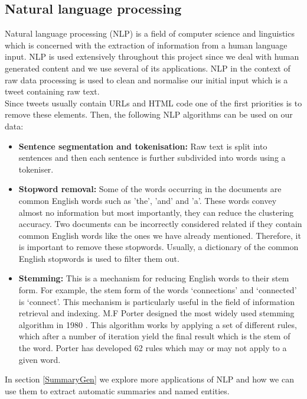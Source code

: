 \subsection{Natural language processing}

Natural language processing (NLP) is a field of computer science and linguistics which is concerned with the extraction of information from a human language 
input. NLP is used extensively throughout this project since we deal with human generated content and we use several of its applications. NLP in the context 
of raw data processing is used to clean and normalise our initial input which is a tweet containing raw text.\\ 
Since tweets usually contain URLs and HTML code one of the first priorities is to remove these elements. Then, the following NLP algorithms
can be used on our data:

\begin{itemize}
 \item \textbf{Sentence segmentation and tokenisation:} Raw text is split into sentences and then each sentence is further subdivided into words using a tokeniser. 
 \item \textbf{Stopword removal:} Some of the words occurring in the documents are common English words such as 'the', 'and' and 'a'. These words convey almost no information 
 but most importantly, they can reduce the clustering accuracy. Two documents can be incorrectly considered related if they contain common English words like the ones
  we have already mentioned. Therefore, it is important to remove these stopwords. Usually, a dictionary of the common English stopwords is used to filter them out.   
 \item \textbf{Stemming:} This is a mechanism for reducing English words to their stem form. For example, the stem form of the words `connections' and `connected' is `connect'. This mechanism is particularly useful in the field of information retrieval and indexing. M.F Porter designed the most widely used stemming algorithm in 1980 \citep{porter_1980}. This algorithm works by applying a set of different rules, which after a number of iteration yield the final result which is the stem of the word. Porter has developed 62 rules which may or may not apply to a given word.
\end{itemize}\vspace{15pt}
In section \ref{SummaryGen} we explore more applications of NLP and how we can use them to extract automatic summaries and named entities.

